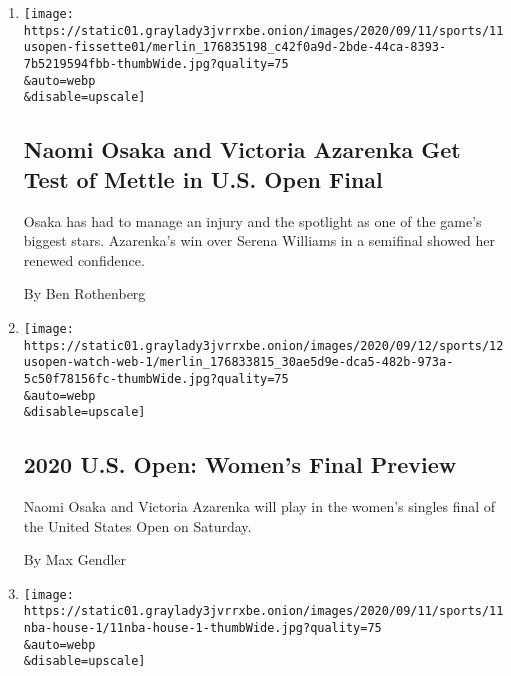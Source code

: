 \begin{enumerate}
\def\labelenumi{\arabic{enumi}.}
\item
  \href{/2020/09/12/sports/naomi-osaka-and-victoria-azarenka-get-test-of-mettle-in-us-open-final.html}{}

  \texttt{[image: https://static01.graylady3jvrrxbe.onion/images/2020/09/11/sports/11usopen-fissette01/merlin\_176835198\_c42f0a9d-2bde-44ca-8393-7b5219594fbb-thumbWide.jpg?quality=75\\\&auto=webp\\\&disable=upscale]}

  \hypertarget{naomi-osaka-and-victoria-azarenka-get-test-of-mettle-in-us-open-final}{%
  \subsection{Naomi Osaka and Victoria Azarenka Get Test of Mettle in
  U.S. Open
  Final}\label{naomi-osaka-and-victoria-azarenka-get-test-of-mettle-in-us-open-final}}

  Osaka has had to manage an injury and the spotlight as one of the
  game's biggest stars. Azarenka's win over Serena Williams in a
  semifinal showed her renewed confidence.

  By Ben Rothenberg
\item
  \href{/2020/09/12/sports/2020-us-open-womens-final-preview.html}{}

  \texttt{[image: https://static01.graylady3jvrrxbe.onion/images/2020/09/12/sports/12usopen-watch-web-1/merlin\_176833815\_30ae5d9e-dca5-482b-973a-5c50f78156fc-thumbWide.jpg?quality=75\\\&auto=webp\\\&disable=upscale]}

  \hypertarget{2020-us-open-womens-final-preview}{%
  \subsection{2020 U.S. Open: Women's Final
  Preview}\label{2020-us-open-womens-final-preview}}

  Naomi Osaka and Victoria Azarenka will play in the women's singles
  final of the United States Open on Saturday.

  By Max Gendler
\item
  \href{/2020/09/11/sports/basketball/nba-houston-rockets-danuel-house.html}{}

  \texttt{[image: https://static01.graylady3jvrrxbe.onion/images/2020/09/11/sports/11nba-house-1/11nba-house-1-thumbWide.jpg?quality=75\\\&auto=webp\\\&disable=upscale]}

  \hypertarget{rockets-danuel-house-leaves-nba-bubble-after-violation}{%
}
\end{enumerate}
